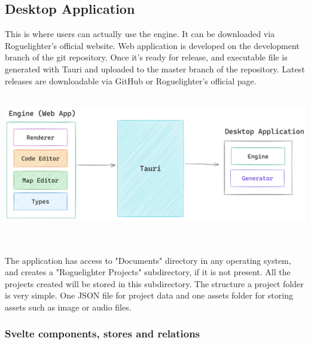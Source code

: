 \documentclass{article}
\begin{document}
\subsection{Desktop Application}
This is where users can actually use the engine. It can be downloaded via Roguelighter's official website. Web application is developed on the development branch of the git repository. Once it's ready for release, and executable file is generated with Tauri and uploaded to the master branch of the repository. Latest releases are downloadable via GitHub or Roguelighter's official page. \\\\
\begin{minipage}{\linewidth}
    \centering
    \includegraphics[width=1\textwidth]{pipeline.png}
\end{minipage}\\\\

The application has access to "Documents" directory in any operating system, and creates a "Roguelighter Projects" subdirectory, if it is not present. All the projects created will be stored in this subdirectory. The structure a project folder is very simple. One JSON file for project data and one assets folder for storing assets such as image or audio files.

\subsubsection{Svelte components, stores and relations}
\end{document}
